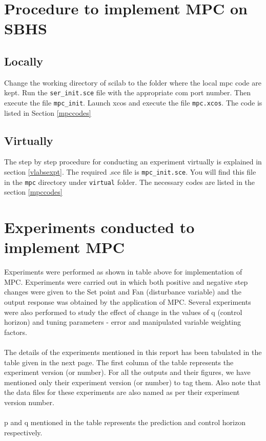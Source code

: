 \section{Procedure to implement MPC on SBHS}
\subsection{Locally}

Change the working directory of scilab to the folder where the local mpc code are kept. Run the {\tt ser\_init.sce} file with the appropriate com port number. Then execute the file {\tt mpc\_init}. Launch xcos and execute the file {\tt mpc.xcos}. The code is listed in Section \ref{mpccodes}
\subsection{Virtually}
The step by step procedure for conducting an experiment virtually is explained in section \ref{vlabsexpt}. The required .sce file is {\tt mpc\_init.sce}.  You will find this file in the {\tt mpc} directory under {\tt virtual} folder. The necessary codes are listed in the section \ref{mpccodes}










\section{Experiments conducted to implement MPC}
Experiments were performed as shown in table above for implementation of MPC. Experiments were carried out in which both positive and negative step changes were given to the Set point and Fan (disturbance variable) and the output response was obtained by the application of MPC. Several experiments were also performed to study the effect of change in the values of q (control horizon) and tuning parameters - error and manipulated variable weighting factors. \\ \\
The details of the experiments mentioned in this report has been tabulated in the table given in the next page. The first column of the table represents the experiment version (or number). For all the outputs and their figures, we have mentioned only their experiment version (or number) to tag them. Also note that the data files for these experiments are also named as per their experiment version number. \\ \\
p and q mentioned in the table represents the prediction and control horizon respectively. \\ \\

